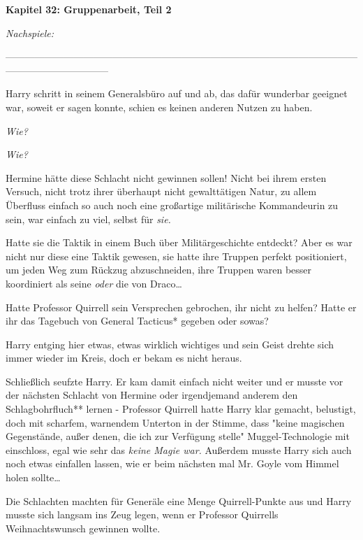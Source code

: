 

\hypertarget{gruppenarbeit-teil-2}{%

\textbf{Kapitel 32: Gruppenarbeit, Teil 2\\ }

\emph{Nachspiele:}

--------------------------------------------------------------------------------------------------------------------------------------------

Harry schritt in seinem Generalsbüro auf und ab, das dafür wunderbar geeignet war, soweit er sagen konnte, schien es keinen anderen Nutzen zu haben.

\emph{Wie?}

\emph{Wie?}

Hermine hätte diese Schlacht nicht gewinnen sollen! Nicht bei ihrem ersten Versuch, nicht trotz ihrer überhaupt nicht gewalttätigen Natur, zu allem Überfluss einfach so auch noch eine großartige militärische Kommandeurin zu sein, war einfach zu viel, selbst für \emph{sie.}

Hatte sie die Taktik in einem Buch über Militärgeschichte entdeckt? Aber es war nicht nur diese eine Taktik gewesen, sie hatte ihre Truppen perfekt positioniert, um jeden Weg zum Rückzug abzuschneiden, ihre Truppen waren besser koordiniert als seine \emph{oder} die von Draco…

Hatte Professor Quirrell sein Versprechen gebrochen, ihr nicht zu helfen? Hatte er ihr das Tagebuch von General Tacticus* gegeben oder sowas?

Harry entging hier etwas, etwas wirklich wichtiges und sein Geist drehte sich immer wieder im Kreis, doch er bekam es nicht heraus.

Schließlich seufzte Harry. Er kam damit einfach nicht weiter und er musste vor der nächsten Schlacht von Hermine oder irgendjemand anderem den Schlagbohrfluch** lernen - Professor Quirrell hatte Harry klar gemacht, belustigt, doch mit scharfem, warnendem Unterton in der Stimme, dass "keine magischen Gegenstände, außer denen, die ich zur Verfügung stelle" Muggel-Technologie mit einschloss, egal wie sehr das \emph{keine Magie war.} Außerdem musste Harry sich auch noch etwas einfallen lassen, wie er beim nächsten mal Mr. Goyle vom Himmel holen sollte…

Die Schlachten machten für Generäle eine Menge Quirrell-Punkte aus und Harry musste sich langsam ins Zeug legen, wenn er Professor Quirrells Weihnachtswunsch gewinnen wollte.

}
